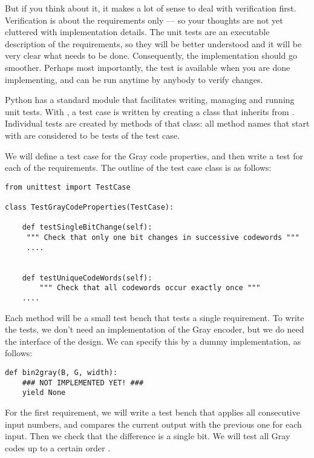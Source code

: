But if you think about it, it makes a lot of sense to deal with
verification first. Verification is about the requirements only --- so
your thoughts are not yet cluttered with implementation details. The
unit tests are an executable description of the requirements, so they
will be better understood and it will be very clear what needs to be
done. Consequently, the implementation should go smoother. Perhaps
most importantly, the test is available when you are done
implementing, and can be run anytime by anybody to verify changes.

Python has a standard  module that facilitates writing,
managing and running unit tests. With , a test case is 
written by creating a class that inherits from
. Individual tests are created by methods of
that class: all method names that start with  are
considered to be tests of the test case.

We will define a test case for the Gray code properties, and then
write a test for each of the requirements. The outline of the test
case class is as follows:

\begin{verbatim}
from unittest import TestCase

class TestGrayCodeProperties(TestCase):

    def testSingleBitChange(self):
     """ Check that only one bit changes in successive codewords """
     ....


    def testUniqueCodeWords(self):
        """ Check that all codewords occur exactly once """
    ....
\end{verbatim}

Each method will be a small test bench that tests a single
requirement. To write the tests, we don't need an implementation of
the Gray encoder, but we do need the interface of the design. We can
specify this by a dummy implementation, as follows:

\begin{verbatim}
def bin2gray(B, G, width):
    ### NOT IMPLEMENTED YET! ###
    yield None
\end{verbatim}

For the first requirement, we will write a test bench that applies all
consecutive input numbers, and compares the current output with the
previous one for each input. Then we check that the difference is a
single bit. We will test all Gray codes up to a certain order
.

